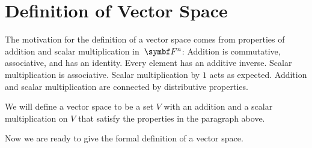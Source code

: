 \section{Definition of Vector Space} \label{1DefVS}

The motivation for the definition of a vector space comes from
properties of addition and scalar multiplication in~$\F{n}$:
Addition is commutative, associative, and has an
identity.  Every element has an additive inverse.  Scalar
multiplication is associative. Scalar multiplication by $1$ acts as
expected. Addition and scalar multiplication are connected by distributive  properties.

We will define a vector space to be a set $V$
with an addition and a scalar multiplication on $V$ that satisfy the properties
in the paragraph above.


Now we are ready to give the formal definition of a vector space.

\vspace{-.05in}

